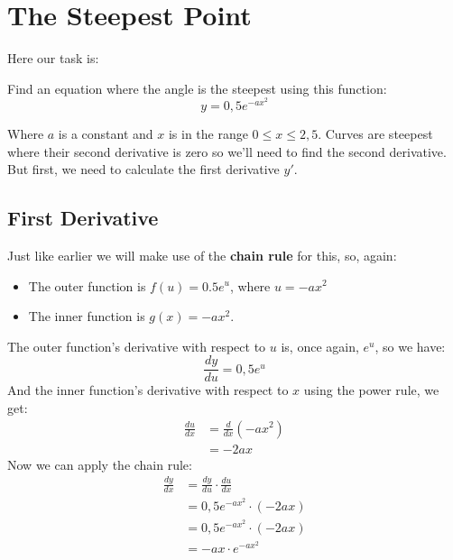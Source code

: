 \documentclass[a4paper,12pt]{article}
\begin{document}
\section{The Steepest Point}
\label{sec:uppg2}
Here our task is:\\
\begin{addmargin}[1em]{1em}
    Find an equation where the angle is the steepest using this function: %
    \begin{displaymath}
        y = 0,5e^{-ax^2} %
    \end{displaymath}
\end{addmargin}
Where $a$ is a constant and $x$ is in the range $0 \leq x \leq 2,5$. 
Curves are steepest where their second derivative is zero so we'll need to 
find the second derivative. But first, we need to calculate the first 
derivative $y'$.
%
\subsection{First Derivative}
Just like earlier we will make use of the \textbf{chain rule} 
for this, so, again:
\begin{itemize}
    \item The outer function is $f(u) = 0.5e^u$, where $u = -ax^2$ %
    \item The inner function is $g(x) = -ax^2$.
\end{itemize}
The outer function's derivative with respect to $u$ is, once again, $e^u$, 
so we have:
\begin{equation}
    \frac{dy}{du} = 0,5e^u %
\end{equation}
And the inner function's derivative with respect to $x$ using the power rule, 
we get:
\begin{equation}
    \begin{split} %
      \frac{du}{dx} &= \frac{d}{dx}\left(-ax^2\right) \\ %
                    &= -2ax %
    \end{split}
\end{equation}
Now we can apply the chain rule:
\begin{equation}
    \begin{split} %
      \frac{dy}{dx} &= \frac{dy}{du} \cdot \frac{du}{dx} \\ %
                    &= 0,5e^{-ax^2} \cdot \left(-2ax\right) \\ %
                    &= 0,5e^{-ax^2} \cdot \left(-2ax\right) \\ 
                    &= -ax \cdot e^{-ax^2}
    \end{split}
\end{equation}
%
\end{document}
